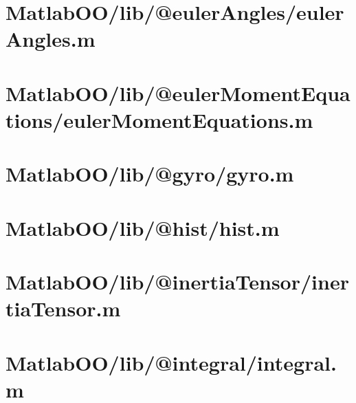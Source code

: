 \pagebreak
\section{MatlabOO/lib/@eulerAngles/eulerAngles.m}\label{code:MatlabOO/lib/@eulerAngles/eulerAngles.m}


\pagebreak
\section{MatlabOO/lib/@eulerMomentEquations/eulerMomentEquations.m}\label{code:MatlabOO/lib/@eulerMomentEquations/eulerMomentEquations.m}


\pagebreak
\section{MatlabOO/lib/@gyro/gyro.m}\label{code:MatlabOO/lib/@gyro/gyro.m}


\pagebreak
\section{MatlabOO/lib/@hist/hist.m}\label{code:MatlabOO/lib/@hist/hist.m}


\pagebreak
\section{MatlabOO/lib/@inertiaTensor/inertiaTensor.m}\label{code:MatlabOO/lib/@inertiaTensor/inertiaTensor.m}


\pagebreak
\section{MatlabOO/lib/@integral/integral.m}\label{code:MatlabOO/lib/@integral/integral.m}


\pagebreak
